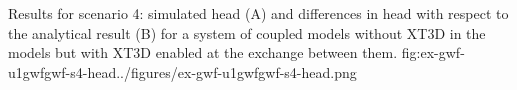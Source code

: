 \begin{StandardFigure}{
                                     Results for scenario 4: simulated head (A) and differences in head with respect to the analytical result (B)  for a system of coupled models without XT3D in the models but with XT3D enabled at the exchange between them.
                                     }{fig:ex-gwf-u1gwfgwf-s4-head}{../figures/ex-gwf-u1gwfgwf-s4-head.png}
\end{StandardFigure}
